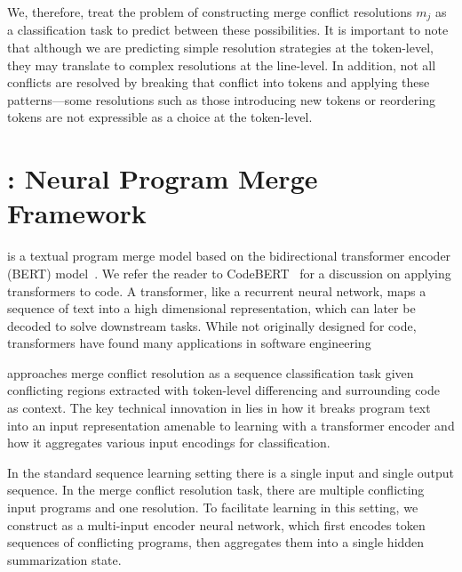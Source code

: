 We, therefore, treat the problem of constructing merge conflict resolutions $m_j$ as a classification task to predict between these possibilities. It is important to note that although we are predicting simple resolution strategies at the token-level, they may translate to complex resolutions at the line-level. In addition, not all conflicts are resolved by breaking that conflict into tokens and applying these patterns---some resolutions such as those introducing new tokens or reordering tokens are not expressible as a choice at the token-level.  



\section{\thistool{}: Neural Program Merge Framework}
\label{sec:main_model}

\thistool{} is a textual program merge model based on the bidirectional transformer encoder (BERT) model~\cite{bert}.
We refer the reader to CodeBERT~\cite{feng-etal-2020-codebert} for a discussion on applying transformers to code. A transformer, like
a recurrent neural network, maps a sequence of text into a high
dimensional representation, which can later be decoded to solve
downstream tasks. While not originally designed for code, transformers have found many applications in software engineering~\cite{clement2020pymt5,kanade2020learning,svyatkovskiy2020intellicode}

\thistool{} approaches merge conflict resolution as a sequence classification task given conflicting regions extracted with token-level differencing and surrounding code as context. 
The key technical innovation in \thistool{} lies in how it breaks program text into an input representation amenable to learning with a transformer encoder and how it aggregates various input encodings for classification. 

In the standard sequence learning setting there is a single input and single output sequence. In the merge conflict resolution task, there are multiple conflicting input programs and one resolution. To facilitate learning in this setting, we construct \thistool{} as a multi-input encoder neural network, which first encodes token sequences of conflicting programs, then aggregates them into a single hidden summarization state. 

